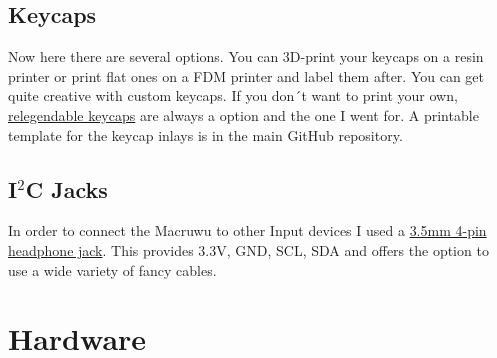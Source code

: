 \documentclass[english, 12pt]{scrartcl}
\begin{document}
	\subsection{Keycaps}
	Now here there are several options. You can 3D-print your keycaps on a resin printer or print flat ones on a FDM printer and label them after. You can get quite creative with custom keycaps. If you don´t want to print your own, \href{https://de.aliexpress.com/item/1005003047698548.html}{relegendable keycaps} are always a option and the one I went for. A printable template for the keycap inlays is in the main GitHub repository.
	
	\subsection{I$^2$C Jacks}
	In order to connect the Macruwu to other Input devices I used a \href{https://keycapsss.com/keyboard-parts/parts/54/2x-trrs-jacks-3.5mm?c=11}{3.5mm 4-pin headphone jack}. This provides 3.3V, GND, SCL, SDA and offers the option to use a wide variety of fancy cables.
	\newpage
	\section{Hardware}
	
\end{document}
